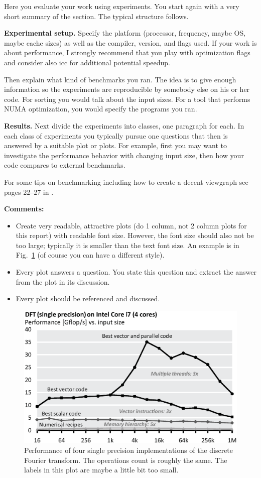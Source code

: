 \documentclass[letterpaper]{article}
\newcommand{\mypar}[1]{{\bf #1.}}
\begin{document}
Here you evaluate your work using experiments. You start again with a
very short summary of the section. The typical structure follows.

\mypar{Experimental setup} Specify the platform (processor, frequency, maybe OS, maybe cache sizes)
as well as the compiler, version, and flags used. If your work is about performance,
I strongly recommend that you play with optimization flags and consider also icc for additional potential speedup.

Then explain what kind of benchmarks you ran. The idea is to give enough information so the experiments are reproducible by somebody else on his or her code.
For sorting you would talk about the input sizes. For a tool that performs NUMA optimization, you would specify the programs you ran.

\mypar{Results}
Next divide the experiments into classes, one paragraph for each. In each class of experiments you typically pursue one questions that then is answered by a suitable plot or plots. For example, first you may want to investigate the performance behavior with changing input size, then how your code compares to external benchmarks.

For some tips on benchmarking including how to create a decent viewgraph see pages 22--27 in \cite{Pueschel:10}.

{\bf Comments:}
\begin{itemize}
\item Create very readable, attractive plots (do 1 column, not 2 column plots
for this report) with readable font size. However, the font size should also not be too large; typically it is smaller than the text font size.
An example is in Fig.~\ref{fftperf} (of course you can have a different style).
\item Every plot answers a question. You state this question and extract the
answer from the plot in its discussion.
\item Every plot should be referenced and discussed.
\end{itemize}

\begin{figure}\centering
  \includegraphics[scale=0.33]{dft-performance.eps}
  \caption{Performance of four single precision implementations of the
  discrete Fourier transform. The operations count is roughly the
  same. The labels in this plot are maybe a little bit too small.\label{fftperf}}
\end{figure}
\end{document}
